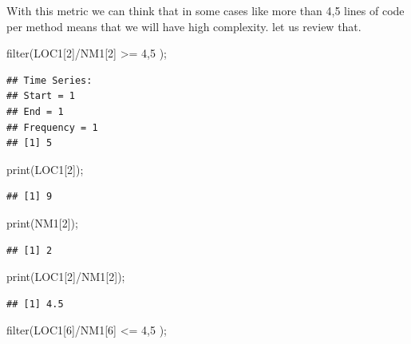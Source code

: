 \documentclass[
]{article}
\newenvironment{Shaded}{\begin{snugshade}}{\end{snugshade}}
\newcommand{\DecValTok}[1]{\textcolor[rgb]{0.00,0.00,0.81}{#1}}
\newcommand{\FunctionTok}[1]{\textcolor[rgb]{0.00,0.00,0.00}{#1}}
\newcommand{\NormalTok}[1]{#1}
\newcommand{\SpecialCharTok}[1]{\textcolor[rgb]{0.00,0.00,0.00}{#1}}
\begin{document}
With this metric we can think that in some cases like more than 4,5
lines of code per method means that we will have high complexity. let us
review that.

\begin{Shaded}
\begin{Highlighting}[]
\FunctionTok{filter}\NormalTok{(LOC1[}\DecValTok{2}\NormalTok{]}\SpecialCharTok{/}\NormalTok{NM1[}\DecValTok{2}\NormalTok{] }\SpecialCharTok{\textgreater{}=} \DecValTok{4}\NormalTok{,}\DecValTok{5}\NormalTok{ );}
\end{Highlighting}
\end{Shaded}

\begin{verbatim}
## Time Series:
## Start = 1 
## End = 1 
## Frequency = 1 
## [1] 5
\end{verbatim}

\begin{Shaded}
\begin{Highlighting}[]
\FunctionTok{print}\NormalTok{(LOC1[}\DecValTok{2}\NormalTok{]);}
\end{Highlighting}
\end{Shaded}

\begin{verbatim}
## [1] 9
\end{verbatim}

\begin{Shaded}
\begin{Highlighting}[]
\FunctionTok{print}\NormalTok{(NM1[}\DecValTok{2}\NormalTok{]);}
\end{Highlighting}
\end{Shaded}

\begin{verbatim}
## [1] 2
\end{verbatim}

\begin{Shaded}
\begin{Highlighting}[]
\FunctionTok{print}\NormalTok{(LOC1[}\DecValTok{2}\NormalTok{]}\SpecialCharTok{/}\NormalTok{NM1[}\DecValTok{2}\NormalTok{]);}
\end{Highlighting}
\end{Shaded}

\begin{verbatim}
## [1] 4.5
\end{verbatim}

\begin{Shaded}
\begin{Highlighting}[]
\FunctionTok{filter}\NormalTok{(LOC1[}\DecValTok{6}\NormalTok{]}\SpecialCharTok{/}\NormalTok{NM1[}\DecValTok{6}\NormalTok{] }\SpecialCharTok{\textless{}=} \DecValTok{4}\NormalTok{,}\DecValTok{5}\NormalTok{ );}
\end{Highlighting}
\end{Shaded}
\end{document}
